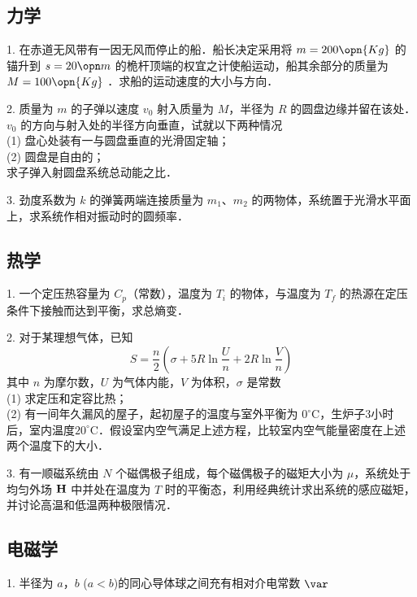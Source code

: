 \subsection{力学}
1. 在赤道无风带有一因无风而停止的船．船长决定采用将 $m=200\opn{Kg}$ 的锚升到 $s=20\opn m$ 的桅杆顶端的权宜之计使船运动，船其余部分的质量为 $M=100 \opn{Kg}$ ．求船的运动速度的大小与方向．

2. 质量为 $m$ 的子弹以速度 $v_0$ 射入质量为 $M$，半径为 $R$ 的圆盘边缘并留在该处．$v_0$ 的方向与射入处的半径方向垂直，试就以下两种情况\\
(1) 盘心处装有一与圆盘垂直的光滑固定轴；\\
(2) 圆盘是自由的；\\
求子弹入射圆盘系统总动能之比．

3. 劲度系数为 $k$ 的弹簧两端连接质量为 $m_1$、$m_2$ 的两物体，系统置于光滑水平面上，求系统作相对振动时的圆频率．
\subsection{热学}
1. 一个定压热容量为 $C_p$（常数），温度为 $T_i$ 的物体，与温度为 $T_f$ 的热源在定压条件下接触而达到平衡，求总熵变．

2. 对于某理想气体，已知
\begin{equation}
S=\frac n2 (\sigma+5R\ln{\frac Un}+2R\ln{\frac Vn})
\end{equation}
其中 $n$ 为摩尔数，$U$ 为气体内能，$V$ 为体积，$\sigma$ 是常数\\
(1) 求定压和定容比热；\\
(2) 有一间年久漏风的屋子，起初屋子的温度与室外平衡为 $0^\circ\mathrm{C}$，生炉子3小时后，室内温度$20^\circ\mathrm{C}$．假设室内空气满足上述方程，比较室内空气能量密度在上述两个温度下的大小．

3. 有一顺磁系统由 $N$ 个磁偶极子组成，每个磁偶极子的磁矩大小为 $\mu$，系统处于均匀外场 $\bf H$ 中并处在温度为 $T$ 时的平衡态，利用经典统计求出系统的感应磁矩，并讨论高温和低温两种极限情况．
\subsection{电磁学}
1. 半径为 $a$，$b$ ($a<b$)的同心导体球之间充有相对介电常数 $\var$

